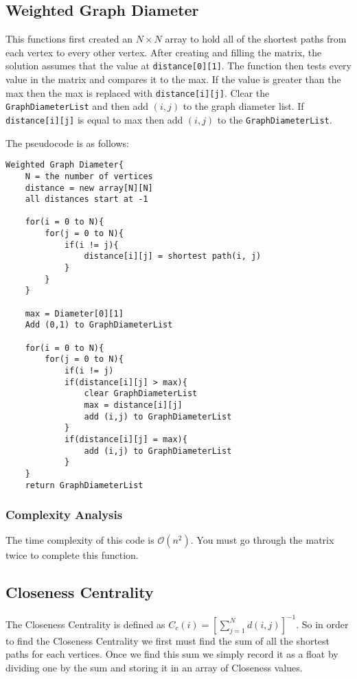 \documentclass{article}
\begin{document}
\subsection{Weighted Graph Diameter}
This functions first created an $N \times N$ array to hold all of the shortest paths from each vertex to every other
vertex. After creating and filling the matrix, the solution assumes that the value at \texttt{distance[0][1]}. The function then tests every value in the matrix and compares it to the max. If the value is greater than the max then the max is replaced
with \texttt{distance[i][j]}. Clear the \texttt{GraphDiameterList} and then add $(i, j)$ to the graph diameter list. If \texttt{distance[i][j]} is equal to max then add $(i, j)$ to the \texttt{GraphDiameterList}.

The pseudocode is as follows:

\begin{verbatim}
Weighted Graph Diameter{
    N = the number of vertices
    distance = new array[N][N]
    all distances start at -1

    for(i = 0 to N){
        for(j = 0 to N){
            if(i != j){
                distance[i][j] = shortest path(i, j)
            }
        }
    }

    max = Diameter[0][1]
    Add (0,1) to GraphDiameterList

    for(i = 0 to N){
        for(j = 0 to N){
            if(i != j)
            if(distance[i][j] > max){
                clear GraphDiameterList
                max = distance[i][j]
                add (i,j) to GraphDiameterList
            }
            if(distance[i][j] = max){
                add (i,j) to GraphDiameterList
            }
    }
    return GraphDiameterList
\end{verbatim}

\subsubsection{Complexity Analysis}
The time complexity of this code is $\mathcal{O}(n^2)$. You must go through the matrix twice to complete this function.

\subsection{Closeness Centrality}
The Closeness Centrality is defined as $C_c(i) =[ \sum_{j=1}^{N} d(i,j)]^{-1}$. So in order to find the Closeness Centrality we first must find the sum of all the shortest paths for each vertices. Once we find this sum we simply record it as a float by dividing one by the sum and storing it in an array of Closeness values.
\end{document}

